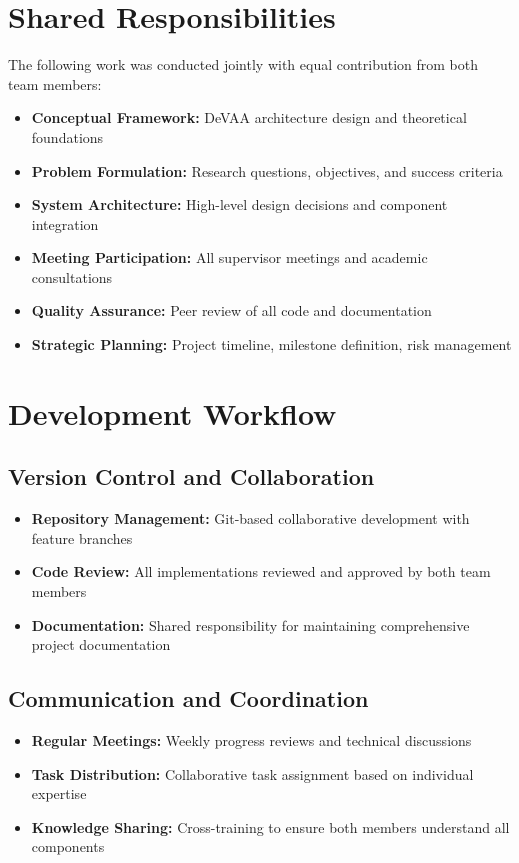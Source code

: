\section{Shared Responsibilities}

The following work was conducted jointly with equal contribution from both team members:

\begin{itemize}
\item \textbf{Conceptual Framework:} DeVAA architecture design and theoretical foundations
\item \textbf{Problem Formulation:} Research questions, objectives, and success criteria
\item \textbf{System Architecture:} High-level design decisions and component integration
\item \textbf{Meeting Participation:} All supervisor meetings and academic consultations
\item \textbf{Quality Assurance:} Peer review of all code and documentation
\item \textbf{Strategic Planning:} Project timeline, milestone definition, risk management
\end{itemize}

\section{Development Workflow}

\subsection{Version Control and Collaboration}
\begin{itemize}
\item \textbf{Repository Management:} Git-based collaborative development with feature branches
\item \textbf{Code Review:} All implementations reviewed and approved by both team members
\item \textbf{Documentation:} Shared responsibility for maintaining comprehensive project documentation
\end{itemize}

\subsection{Communication and Coordination}
\begin{itemize}
\item \textbf{Regular Meetings:} Weekly progress reviews and technical discussions
\item \textbf{Task Distribution:} Collaborative task assignment based on individual expertise
\item \textbf{Knowledge Sharing:} Cross-training to ensure both members understand all components
\end{itemize}

